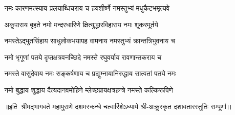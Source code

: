 

\twolineshloka
{नमः कारणमत्स्याय प्रलयाब्धिचराय च}
{हयशीर्ष्णे नमस्तुभ्यं मधुकैटभमृत्यवे}%

\twolineshloka
{अकूपाराय बृहते नमो मन्दरधारिणे}
{क्षित्युद्धारविहाराय नमः शूकरमूर्तये}%

\twolineshloka
{नमस्तेऽद्भुतसिंहाय साधुलोकभयापह}
{वामनाय नमस्तुभ्यं क्रान्तत्रिभुवनाय च}%

\twolineshloka
{नमो भृगूणां पतये दृप्तक्षत्रवनच्छिदे}
{नमस्ते रघुवर्याय रावणान्तकराय च}%

\twolineshloka
{नमस्ते वासुदेवाय नमः सङ्कर्षणाय च}
{प्रद्युम्नायानिरुद्धाय सात्वतां पतये नमः}%

\twolineshloka
{नमो बुद्धाय शुद्धाय दैत्यदानवमोहिने}
{म्लेच्छप्रायक्षत्रहन्त्रे नमस्ते कल्किरूपिणे}%

॥इति~श्रीमद्भागवते महापुराणे दशमस्कन्धे चत्वारिंशेऽध्याये श्री-अक्रूरकृत दशावतारस्तुतिः सम्पूर्णा॥ 
%

%

%
%
